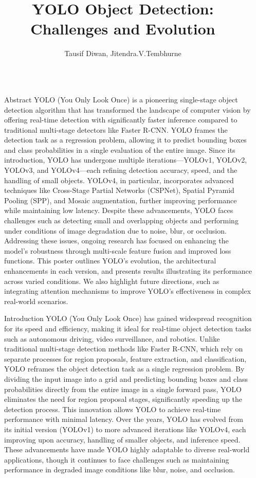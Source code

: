 \documentclass[final]{beamer}
\title{\textbf{YOLO Object Detection: Challenges and Evolution}}
\author{Tausif Diwan, Jitendra.V.Tembhurne}
\institute[IIITN]{Indian Institute of Information Technology, Nagpur}
\newlength{\sepwidth}
\newlength{\colwidth}
\newcommand{\separatorcolumn}{\begin{column}{\sepwidth}\end{column}}
\begin{document}
\begin{frame}[t]
\begin{columns}[t]
\separatorcolumn

\begin{column}{\colwidth}
  \begin{block}{Abstract}
    YOLO (You Only Look Once) is a pioneering single-stage object detection algorithm that has transformed the landscape of computer vision by offering real-time detection with significantly faster inference compared to traditional multi-stage detectors like Faster R-CNN. YOLO frames the detection task as a regression problem, allowing it to predict bounding boxes and class probabilities in a single evaluation of the entire image. Since its introduction, YOLO has undergone multiple iterations—YOLOv1, YOLOv2, YOLOv3, and YOLOv4—each refining detection accuracy, speed, and the handling of small objects. YOLOv4, in particular, incorporates advanced techniques like Cross-Stage Partial Networks (CSPNet), Spatial Pyramid Pooling (SPP), and Mosaic augmentation, further improving performance while maintaining low latency.
Despite these advancements, YOLO faces challenges such as detecting small and overlapping objects and performing under conditions of image degradation due to noise, blur, or occlusion. Addressing these issues, ongoing research has focused on enhancing the model’s robustness through multi-scale feature fusion and improved loss functions. This poster outlines YOLO’s evolution, the architectural enhancements in each version, and presents results illustrating its performance across varied conditions. We also highlight future directions, such as integrating attention mechanisms to improve YOLO’s effectiveness in complex real-world scenarios.
  \end{block}
  
  \begin{block}{Introduction}
    YOLO (You Only Look Once) has gained widespread recognition for its speed and efficiency, making it ideal for real-time object detection tasks such as autonomous driving, video surveillance, and robotics. Unlike traditional multi-stage detection methods like Faster R-CNN, which rely on separate processes for region proposals, feature extraction, and classification, YOLO reframes the object detection task as a single regression problem. By dividing the input image into a grid and predicting bounding boxes and class probabilities directly from the entire image in a single forward pass, YOLO eliminates the need for region proposal stages, significantly speeding up the detection process. This innovation allows YOLO to achieve real-time performance with minimal latency. Over the years, YOLO has evolved from its initial version (YOLOv1) to more advanced iterations like YOLOv4, each improving upon accuracy, handling of smaller objects, and inference speed. These advancements have made YOLO highly adaptable to diverse real-world applications, though it continues to face challenges such as maintaining performance in degraded image conditions like blur, noise, and occlusion.
  \end{block}


\end{column}
\end{columns}
\end{frame}
\end{document}
